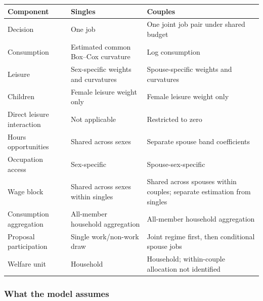 \documentclass[11pt,a4paper]{article}
\begin{document}
{ %
\small\setlength{\tabcolsep}{3pt}\begin{longtable}[]{@{}
  >{\raggedright\arraybackslash}p{}
  >{\raggedright\arraybackslash}p{}
  >{\raggedright\arraybackslash}p{}@{}}
\toprule\noalign{}
\begin{minipage}[b]{\linewidth}\raggedright
Component
\end{minipage} & \begin{minipage}[b]{\linewidth}\raggedright
Singles
\end{minipage} & \begin{minipage}[b]{\linewidth}\raggedright
Couples
\end{minipage} \\
\midrule\noalign{}
\endhead
\bottomrule\noalign{}
\endlastfoot
Decision & One job & One joint job pair under shared budget \\
Consumption & Estimated common Box--Cox curvature & Log consumption \\
Leisure & Sex-specific weights and curvatures & Spouse-specific weights and curvatures \\
Children & Female leisure weight only & Female leisure weight only \\
Direct leisure interaction & Not applicable & Restricted to zero \\
Hours opportunities & Shared across sexes & Separate spouse band coefficients \\
Occupation access & Sex-specific & Spouse-sex-specific \\
Wage block & Shared across sexes within singles & Shared across spouses within couples; separate estimation from singles \\
Consumption aggregation & All-member household aggregation & All-member household aggregation \\
Proposal participation & Single work/non-work draw & Joint regime first, then conditional spouse jobs \\
Welfare unit & Household & Household; within-couple allocation not identified \\
\end{longtable}
}

\subsubsection{What the model assumes}\label{what-the-model-assumes}
\end{document}
